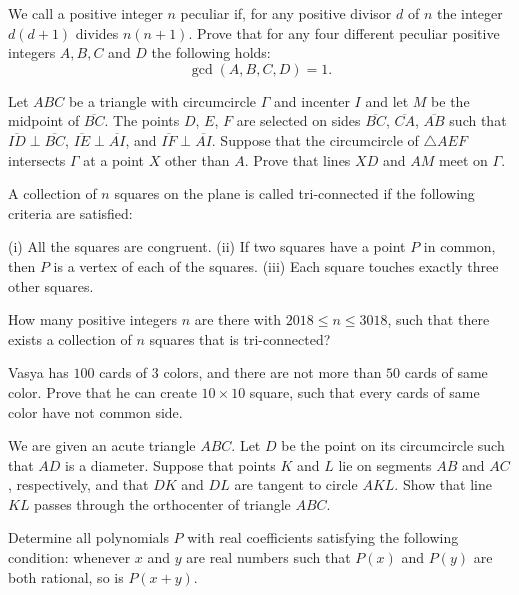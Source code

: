 \documentclass[11pt]{scrartcl}
\begin{document}
\begin{problem}[776638240838060]
	We call a positive integer $n{}$ peculiar if, for any positive divisor $d{}$ of $n{}$ the integer $d(d + 1)$ divides $n(n + 1).$ Prove that for any four different peculiar positive integers $A, B, C$ and $D{}$ the following holds:
\[\gcd(A, B, C, D) = 1.\]
\end{problem}
\begin{problem}[497699112554737]
Let $ABC$ be a triangle with circumcircle $\Gamma$ and incenter $I$ and let $M$ be the midpoint of $\overline{BC}$. The points $D$, $E$, $F$ are selected on sides $\overline{BC}$, $\overline{CA}$, $\overline{AB}$ such that $\overline{ID} \perp \overline{BC}$, $\overline{IE}\perp \overline{AI}$, and $\overline{IF}\perp \overline{AI}$. Suppose that the circumcircle of $\triangle AEF$ intersects $\Gamma$ at a point $X$ other than $A$. Prove that lines $XD$ and $AM$ meet on $\Gamma$.
\end{problem}
\begin{problem}[447976536517137]
A collection of $n$ squares on the plane is called tri-connected if the following criteria are satisfied:

(i) All the squares are congruent.
(ii) If two squares have a point $P$ in common, then $P$ is a vertex of each of the squares.
(iii) Each square touches exactly three other squares.

How many positive integers $n$ are there with $2018\leq n \leq 3018$, such that there exists a collection of $n$ squares that is tri-connected?
\end{problem}
\begin{problem}[122001240071629]
	Vasya has $100$ cards of $3$ colors, and there are not more than $50$ cards of same color. Prove that he can create $10\times 10$ square, such that every cards of same color have not common side.
\end{problem}
\begin{problem}[6412565047152896593]
	We are given an acute triangle $ABC$. Let $D$ be the point on its circumcircle such that $AD$ is a diameter. Suppose that points $K$ and $L$ lie on segments $AB$ and $AC$, respectively, and that $DK$ and $DL$ are tangent to circle $AKL$.
Show that line $KL$ passes through the orthocenter of triangle $ABC$.
\end{problem}
\begin{problem}[57940527352528]
	Determine all polynomials $P$ with real coefficients satisfying the following condition: whenever $x$ and $y$ are real numbers such that $P(x)$ and $P(y)$ are both rational, so is $P(x + y)$.
\end{problem}
\end{document}
